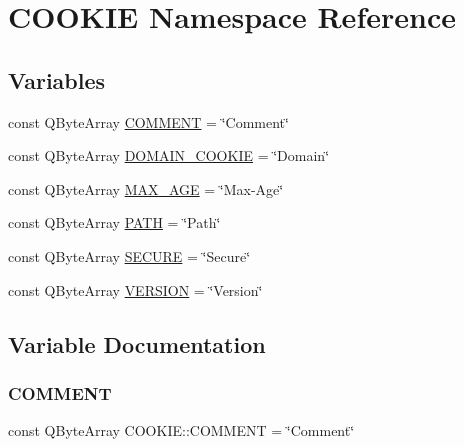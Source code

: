 \hypertarget{namespace_c_o_o_k_i_e}{}\section{C\+O\+O\+K\+IE Namespace Reference}
\label{namespace_c_o_o_k_i_e}
\subsection*{Variables}
\begin{DoxyCompactItemize}
\item 
const Q\+Byte\+Array \hyperlink{namespace_c_o_o_k_i_e_add427bd2cb08d826bb4164c391395ad3}{C\+O\+M\+M\+E\+NT} = \char`\"{}Comment\char`\"{}
\item 
const Q\+Byte\+Array \hyperlink{namespace_c_o_o_k_i_e_af47d5b3c3e1484f747be9724e069056a}{D\+O\+M\+A\+I\+N\+\_\+\+C\+O\+O\+K\+IE} = \char`\"{}Domain\char`\"{}
\item 
const Q\+Byte\+Array \hyperlink{namespace_c_o_o_k_i_e_a7af4a56bc669d3d278dd46f572e0506a}{M\+A\+X\+\_\+\+A\+GE} = \char`\"{}Max-\/Age\char`\"{}
\item 
const Q\+Byte\+Array \hyperlink{namespace_c_o_o_k_i_e_a10dd9536b1d8bfc3549d1f470011b16d}{P\+A\+TH} = \char`\"{}Path\char`\"{}
\item 
const Q\+Byte\+Array \hyperlink{namespace_c_o_o_k_i_e_a8de1a0de25af1c47d1e59ace3dd12969}{S\+E\+C\+U\+RE} = \char`\"{}Secure\char`\"{}
\item 
const Q\+Byte\+Array \hyperlink{namespace_c_o_o_k_i_e_a93f141a88a2b7b73078a041dbfaccaf7}{V\+E\+R\+S\+I\+ON} = \char`\"{}Version\char`\"{}
\end{DoxyCompactItemize}


\subsection{Variable Documentation}
\mbox{\label{namespace_c_o_o_k_i_e_add427bd2cb08d826bb4164c391395ad3}} 
\subsubsection{\texorpdfstring{C\+O\+M\+M\+E\+NT}{COMMENT}}
{\footnotesize\ttfamily const Q\+Byte\+Array C\+O\+O\+K\+I\+E\+::\+C\+O\+M\+M\+E\+NT = \char`\"{}Comment\char`\"{}}

